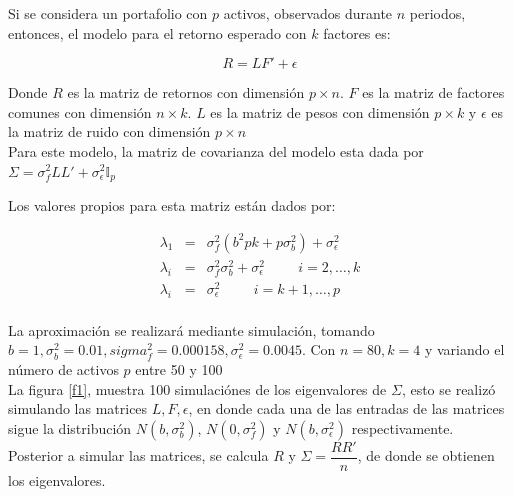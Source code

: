 \documentclass[paper=letter, fontsize=14pt]{scrartcl}
\numberwithin{equation}{section} %
\numberwithin{figure}{section} %
\numberwithin{table}{section} %
\begin{document}
Si se considera un portafolio con $p$ activos, observados durante $n$ periodos, entonces, el modelo para el retorno esperado con $k$ factores es:

$$R=LF'+\epsilon$$

Donde $R$ es la matriz de retornos con dimensión $p\times n$. $F$ es la matriz de factores comunes con dimensión $n \times k$. $L$ es la matriz de pesos con dimensión $p\times k$ y $\epsilon$ es la matriz de ruido con dimensión $p\times n$ \\

Para este modelo, la matriz de covarianza del modelo esta dada por $\Sigma=\sigma_f^2LL'+\sigma_\epsilon^2\mathbb{I}_p$

Los valores propios para esta matriz están dados por:

\begin{eqnarray*}
\lambda_1&=&\sigma_f^2(b^2pk+p\sigma_b^2)+\sigma_\epsilon^2\\
\lambda_i&=&\sigma_f^2\sigma_b^2+\sigma_\epsilon^2 \hspace{1cm} i=2,\hdots,k\\
\lambda_i&=&\sigma_\epsilon^2 \hspace{1cm} i=k+1,\hdots,p\\
\end{eqnarray*}


La aproximación se realizará mediante simulación, tomando $b=1,\sigma_b^2=0.01,sigma_f^2=0.000158,\sigma_\epsilon^2=0.0045$. Con $n=80, k=4$ y variando el número de activos $p$ entre 50 y 100\\

La figura \ref{f1}, muestra 100 simulaciónes de los eigenvalores de $\Sigma$, esto se realizó simulando las matrices $L,F,\epsilon$, en donde cada una de las entradas de las matrices sigue la distribución $N(b,\sigma_b^2)$, $N(0,\sigma_f^2)$ y $N(b,\sigma_\epsilon^2)$ respectivamente.\\

Posterior a simular las matrices, se calcula $R$ y $\Sigma=\dfrac{RR'}{n}$, de donde se obtienen los eigenvalores.\\
\end{document}
